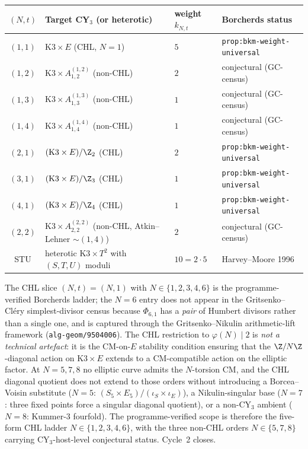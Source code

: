 \begin{center}
\begin{tabular}{clll}
\toprule
$(N, t)$ & Target CY$_3$ (or heterotic) & weight $k_{N, t}$ &
  Borcherds status \\
\midrule
$(1, 1)$ & $\mathrm{K3} \times E$ (CHL, $N = 1$) & $5$ &
  \texttt{prop:bkm-weight-universal} \\
$(1, 2)$ & $\mathrm{K3} \times A_{1, 2}^{(1, 2)}$ (non-CHL) & $2$ &
  conjectural (GC-census) \\
$(1, 3)$ & $\mathrm{K3} \times A_{1, 3}^{(1, 3)}$ (non-CHL) & $1$ &
  conjectural (GC-census) \\
$(1, 4)$ & $\mathrm{K3} \times A_{1, 4}^{(1, 4)}$ (non-CHL) & $1$ &
  conjectural (GC-census) \\
$(2, 1)$ & $(\mathrm{K3} \times E)/\Z_2$ (CHL) & $2$ &
  \texttt{prop:bkm-weight-universal} \\
$(3, 1)$ & $(\mathrm{K3} \times E)/\Z_3$ (CHL) & $1$ &
  \texttt{prop:bkm-weight-universal} \\
$(4, 1)$ & $(\mathrm{K3} \times E)/\Z_4$ (CHL) & $1$ &
  \texttt{prop:bkm-weight-universal} \\
$(2, 2)$ & $\mathrm{K3} \times A_{2, 2}^{(2, 2)}$ (non-CHL,
  Atkin--Lehner $\sim (1, 4)$) & $2$ & conjectural (GC-census) \\
\midrule
STU & heterotic $\mathrm{K3} \times T^2$ with
  $(S, T, U)$ moduli & $10 = 2\cdot 5$ &
  Harvey--Moore 1996 \\
\bottomrule
\end{tabular}
\end{center}

The CHL slice $(N, t) = (N, 1)$ with $N \in \{1, 2, 3, 4, 6\}$ is
the programme-verified Borcherds ladder; the $N = 6$ entry does
not appear in the Gritsenko--Cl\'ery simplest-divisor census
because $\Phi_{6, 1}$ has a \emph{pair} of Humbert divisors
rather than a single one, and is captured through the
Gritsenko--Nikulin arithmetic-lift framework
(\texttt{alg-geom/9504006}). The CHL restriction to
$\varphi(N) \mid 2$ is \emph{not a technical artefact}: it is the
CM-on-$E$ stability condition ensuring that the
$\Z/N\Z$-diagonal action on $\mathrm{K3}\times E$ extends to a
CM-compatible action on the elliptic factor. At $N = 5, 7, 8$ no
elliptic curve admits the $N$-torsion CM, and the CHL diagonal
quotient does not extend to those orders without introducing a
Borcea--Voisin substitute ($N = 5$: $(S_5 \times E_5)/(\iota_S
\times \iota_E)$), a Nikulin-singular base ($N = 7$: three fixed
points force a singular diagonal quotient), or a non-CY$_3$
ambient ($N = 8$: Kummer-$3$ fourfold). The programme-verified
scope is therefore the five-form CHL ladder $N \in \{1, 2, 3, 4,
6\}$, with the three non-CHL orders $N \in \{5, 7, 8\}$ carrying
CY$_3$-host-level conjectural status. Cycle~2 closes.

